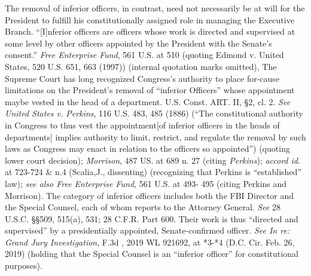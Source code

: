 The removal of inferior officers, in contrast, need not necessarily be at will for the President to fulfill his constitutionally assigned role in managing the Executive Branch.
“[I]nferior officers are officers whose work is directed and supervised at some level by other officers appointed by the President with the Senate’s consent.”
\textit{Free Enterprise Fund}, 561 U.S. at 510 (quoting Edmond v. United States, 520 U.S. 651, 663 (1997)) (internal quotation marks omitted), The Supreme Court has long recognized Congress’s authority to place for-cause limitations on the President’s removal of “inferior Officers” whose appointment maybe vested in the head of a department.
U.S. Const. ART. II, \S 2, cl. 2.
\textit{See United States v. Perkins}, 116 U.S. 483, 485 (1886) (“The constitutional authority in Congress to thus vest the appointment[of inferior officers in the heads of departments] implies authority to limit, restrict, and regulate the removal by such laws as Congress may enact in relation to the officers so appointed”) (quoting lower court decision);
\textit{Morrison}, 487 US. at 689 n. 27 (citing \textit{Perkins});
\textit{accord id}. at 723-724 \& n.4 (Scalia,J., dissenting) (recognizing that Perkins is “established” law);
\textit{see also Free Enterprise Fund}, 561 U.S. at 493- 495 (citing Perkins and Morrison).
The category of inferior officers includes both the FBI Director and the Special Counsel, each of whom reports to the Attorney General.
\textit{See} 28 U.S.C. \S\S 509, 515(a), 531; 28 C.F.R. Part 600.
Their work is thus “directed and supervised” by a presidentially appointed, Senate-confirmed officer.
\textit{See In re: Grand Jury Investigation}, \textunderscore\textunderscore F.3d \textunderscore\textunderscore, 2019 WL 921692, at *3-*4 (D.C. Cir. Feb. 26, 2019) (holding that the Special Counsel is an “inferior officer” for constitutional purposes).

